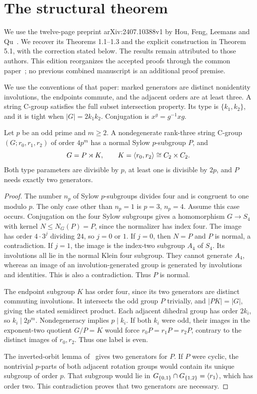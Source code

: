 \section{The structural theorem}
We use the twelve-page preprint arXiv:2407.10388v1 by Hou, Feng,
Leemans and Qu~\cite{HFLQ}. We recover its Theorems 1.1--1.3
and the explicit construction in Theorem 5.1, with the correction stated
below. The results remain attributed to those authors. This edition
reorganizes the accepted proofs through the common paper~\cite{UF};
no previous combined manuscript is an additional proof premise.

We use the conventions of that paper: marked generators are distinct
nonidentity involutions, the endpoints commute, and the adjacent
orders are at least three. A string C-group satisfies the full subset
intersection property. Its type is $\{k_1,k_2\}$, and it is tight
when $|G|=2k_1k_2$. Conjugation is $x^g=g^{-1}xg$.

\begin{theorem}\label{F1.Structure}
Let $p$ be an odd prime and $m\geq2$. A nondegenerate rank-three
string C-group $(G;r_0,r_1,r_2)$ of order $4p^m$ has a normal
Sylow $p$-subgroup $P$, and
\[
 G=P\rtimes K,\qquad K=\langle r_0,r_2\rangle\cong C_2\times C_2.
\]
Both type parameters are divisible by $p$, at least one is divisible
by $2p$, and $P$ needs exactly two generators.
\end{theorem}
\begin{proof}
The number $n_p$ of Sylow $p$-subgroups divides four and is congruent
to one modulo $p$. The only case other than $n_p=1$ is
$p=3$, $n_p=4$. Assume this case occurs. Conjugation on the four
Sylow subgroups gives a homomorphism $G\longrightarrow S_4$ with
kernel $N\leq N_G(P)=P$, since the normalizer has index four.
The image has order $4\cdot3^j$ dividing $24$, so $j=0$ or $1$.
If $j=0$, then $N=P$ and $P$ is normal, a contradiction. If $j=1$,
the image is the index-two subgroup $A_4$ of $S_4$. Its involutions
all lie in the normal Klein four subgroup. They cannot generate
$A_4$, whereas an image of an involution-generated group is generated
by involutions and identities. This is also a contradiction.
Thus $P$ is normal.

The endpoint subgroup $K$ has order four, since its two generators
are distinct commuting involutions. It intersects the odd group $P$
trivially, and $|PK|=|G|$, giving the stated semidirect product.
Each adjacent dihedral group has order $2k_i$, so
$k_i\mid2p^m$. Nondegeneracy implies $p\mid k_i$.
If both $k_i$ were odd, their images in the exponent-two quotient
$G/P=K$ would force $r_0P=r_1P=r_2P$, contrary to the distinct
images of $r_0,r_2$. Thus one label is even.

The inverted-orbit lemma of~\cite{UF} gives two generators for $P$.
If $P$ were cyclic, the nontrivial $p$-parts of both adjacent rotation
groups would contain its unique subgroup of order $p$. That subgroup
would lie in $G_{\{0,1\}}\cap G_{\{1,2\}}=\langle r_1\rangle$,
which has order two. This contradiction proves that two generators
are necessary.
\end{proof}

